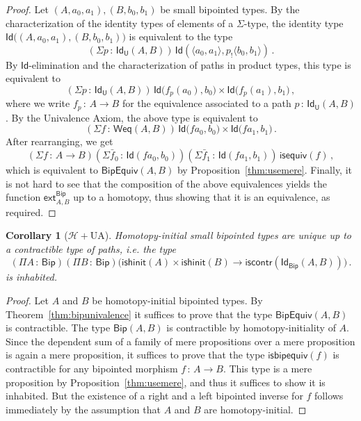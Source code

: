 \documentclass[10pt,a4paper,oneside,reqno]{amsart}
\numberwithin{equation}{section}
\theoremstyle{mythm}
\newtheorem{corollary}[theorem]{Corollary}
\theoremstyle{mydef}
\theoremstyle{myrmk}
\newcommand{\co}{\,{:}\,}
\newcommand{\Hint}{\mathcal{H}}
\newcommand{\iscontr}{\mathsf{iscontr}}
\newcommand{\isequiv}{\mathsf{isequiv}}
\newcommand{\isbiphinit}{\mathsf{ishinit}}
\newcommand{\ext}{\mathsf{ext}}
\newcommand{\Id}{\mathsf{Id}}
\newcommand{\U}{\mathsf{U}}
\newcommand{\Bip}{\mathsf{Bip}}
\newcommand{\BipHom}{\mathsf{Bip}}
\newcommand{\isbipequiv}{\mathsf{isbipequiv}}
\newcommand{\BipEquiv}{\mathsf{BipEquiv}}
\begin{document}
\begin{proof} 
Let $ (A,a_0,a_1), (B,b_0,b_1)$ be small bipointed types. By the characterization of the identity types
of  elements of a $\Sigma$-type, the 
identity type $\Id\big( (A,a_0,a_1),  (B,b_0,b_1)\big)$ is equivalent to  the type
\[
(\Sigma p \co \Id_\U(A,B))  \, \Id(\langle a_0,a_1 \rangle,  p_{!} \langle b_0,b_1\rangle)  \, .
\]
By $\Id$-elimination and the characterization of paths in product types, this type is equivalent to
\[ 
(\Sigma p \co \Id_\U(A,B)) \, \Id \big( f_p(a_0),  b_0\big) \times \Id \big( f_p(a_1) , b_1) \, ,
 \]
where we write $f_p \co A \to B$ for the equivalence associated to a path $p \co \Id_\U(A,B)$.  By the Univalence Axiom,
the above type is equivalent to
\[ 
(\Sigma f \co \mathsf{Weq}(A,B)) \, \Id \big( f a_0 ,  b_0\big) \times \Id \big( f a_1 , b_1\big)  \, .
\]
After rearranging, we get
\[
(\Sigma f  \co A \to B)(\Sigma \bar{f}_0 \co \Id( fa_0, b_0)) (\Sigma \bar{f}_1 \co \Id( fa_1, b_1))  \, \isequiv(f) \, ,
\]
which is equivalent to $\BipEquiv(A,B)$ by Proposition~\ref{thm:usemere}. Finally, it is not hard to see that the composition of the above equivalences yields the  function $\ext^{\Bip}_{A,B}$ up to a homotopy, thus showing that it is an equivalence, as required.
\end{proof} 

\begin{corollary}[$\Hint + \mathrm{UA}$] \label{BoolHInitIso} 
Homotopy-initial small bipointed types are unique up to a contractible type of paths, i.e. the type
\[ 
(\Pi A \co \Bip) (\Pi B \co \Bip)
\big( \isbiphinit(A) \times \isbiphinit(B) \to \iscontr(\Id_\Bip(A,B)) \big) \, .
\] 
is inhabited.
\end{corollary}

\begin{proof} Let $A$ and $B$ be homotopy-initial bipointed types. 
By Theorem~\ref{thm:bipunivalence} it suffices to prove that the type $\BipEquiv(A,B)$ is contractible. The type 
$\BipHom( A, B)$ is contractible by homotopy-initiality of $A$. Since the dependent sum of a family of mere propositions over a mere proposition is again a mere proposition, it suffices to prove that the type $\isbipequiv(f)$ is contractible for any bipointed morphism $f \co A \to B$. This type is a mere proposition by 
Proposition~\ref{thm:usemere}, and thus it suffices to show it is inhabited. But the existence of a right and a left bipointed inverse for $f$ follows immediately
by the assumption that $A$ and $B$ are homotopy-initial.
\end{proof}
\end{document}
